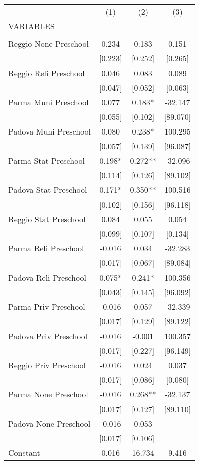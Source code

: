 \begin{tabular}{lccc} \hline
 & (1) & (2) & (3) \\
VARIABLES &  &  &  \\ \hline
 &  &  &  \\
Reggio None Preschool & 0.234 & 0.183 & 0.151 \\
 & [0.223] & [0.252] & [0.265] \\
Reggio Reli Preschool & 0.046 & 0.083 & 0.089 \\
 & [0.047] & [0.052] & [0.063] \\
Parma Muni Preschool & 0.077 & 0.183* & -32.147 \\
 & [0.055] & [0.102] & [89.070] \\
Padova Muni Preschool & 0.080 & 0.238* & 100.295 \\
 & [0.057] & [0.139] & [96.087] \\
Parma Stat Preschool & 0.198* & 0.272** & -32.096 \\
 & [0.114] & [0.126] & [89.102] \\
Padova Stat Preschool & 0.171* & 0.350** & 100.516 \\
 & [0.102] & [0.156] & [96.118] \\
Reggio Stat Preschool & 0.084 & 0.055 & 0.054 \\
 & [0.099] & [0.107] & [0.134] \\
Parma Reli Preschool & -0.016 & 0.034 & -32.283 \\
 & [0.017] & [0.067] & [89.084] \\
Padova Reli Preschool & 0.075* & 0.241* & 100.356 \\
 & [0.043] & [0.145] & [96.092] \\
Parma Priv Preschool & -0.016 & 0.057 & -32.339 \\
 & [0.017] & [0.129] & [89.122] \\
Padova Priv Preschool & -0.016 & -0.001 & 100.357 \\
 & [0.017] & [0.227] & [96.149] \\
Reggio Priv Preschool & -0.016 & 0.024 & 0.037 \\
 & [0.017] & [0.086] & [0.080] \\
Parma None Preschool & -0.016 & 0.268** & -32.137 \\
 & [0.017] & [0.127] & [89.110] \\
Padova None Preschool & -0.016 & 0.053 &  \\
 & [0.017] & [0.106] &  \\
Constant & 0.016 & 16.734 & 9.416 \\

\end{tabular}
